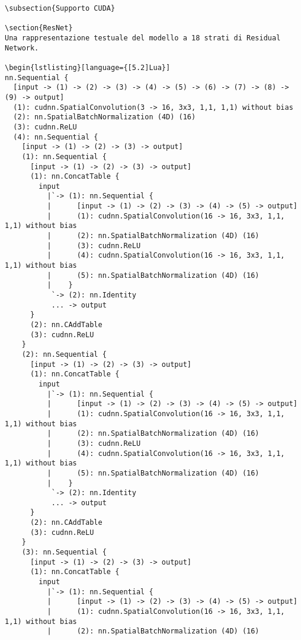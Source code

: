 \begin{lstlisting}[language={[5.2]Lua}]
\subsection{Supporto CUDA}

\section{ResNet}
Una rappresentazione testuale del modello a 18 strati di Residual Network. 

\begin{lstlisting}[language={[5.2]Lua}]
nn.Sequential {
  [input -> (1) -> (2) -> (3) -> (4) -> (5) -> (6) -> (7) -> (8) -> (9) -> output]
  (1): cudnn.SpatialConvolution(3 -> 16, 3x3, 1,1, 1,1) without bias
  (2): nn.SpatialBatchNormalization (4D) (16)
  (3): cudnn.ReLU
  (4): nn.Sequential {
    [input -> (1) -> (2) -> (3) -> output]
    (1): nn.Sequential {
      [input -> (1) -> (2) -> (3) -> output]
      (1): nn.ConcatTable {
        input
          |`-> (1): nn.Sequential {
          |      [input -> (1) -> (2) -> (3) -> (4) -> (5) -> output]
          |      (1): cudnn.SpatialConvolution(16 -> 16, 3x3, 1,1, 1,1) without bias
          |      (2): nn.SpatialBatchNormalization (4D) (16)
          |      (3): cudnn.ReLU
          |      (4): cudnn.SpatialConvolution(16 -> 16, 3x3, 1,1, 1,1) without bias
          |      (5): nn.SpatialBatchNormalization (4D) (16)
          |    }
           `-> (2): nn.Identity
           ... -> output
      }
      (2): nn.CAddTable
      (3): cudnn.ReLU
    }
    (2): nn.Sequential {
      [input -> (1) -> (2) -> (3) -> output]
      (1): nn.ConcatTable {
        input
          |`-> (1): nn.Sequential {
          |      [input -> (1) -> (2) -> (3) -> (4) -> (5) -> output]
          |      (1): cudnn.SpatialConvolution(16 -> 16, 3x3, 1,1, 1,1) without bias
          |      (2): nn.SpatialBatchNormalization (4D) (16)
          |      (3): cudnn.ReLU
          |      (4): cudnn.SpatialConvolution(16 -> 16, 3x3, 1,1, 1,1) without bias
          |      (5): nn.SpatialBatchNormalization (4D) (16)
          |    }
           `-> (2): nn.Identity
           ... -> output
      }
      (2): nn.CAddTable
      (3): cudnn.ReLU
    }
    (3): nn.Sequential {
      [input -> (1) -> (2) -> (3) -> output]
      (1): nn.ConcatTable {
        input
          |`-> (1): nn.Sequential {
          |      [input -> (1) -> (2) -> (3) -> (4) -> (5) -> output]
          |      (1): cudnn.SpatialConvolution(16 -> 16, 3x3, 1,1, 1,1) without bias
          |      (2): nn.SpatialBatchNormalization (4D) (16)

\end{lstlisting}
